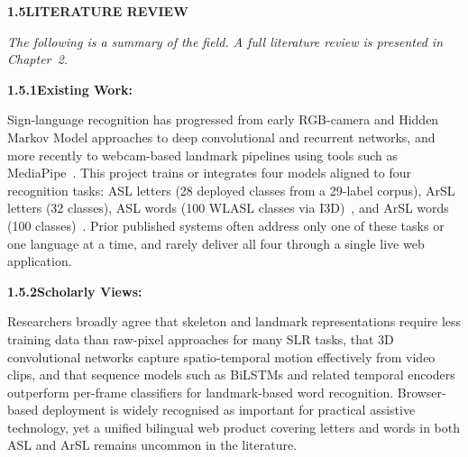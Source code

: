 \begin{secopen}
\noindent\textbf{1.5\quad LITERATURE REVIEW}\par
{}
\vspace{0.4cm}

\noindent\textit{The following is a summary of the field. A full literature review is presented in Chapter~2.}\par\vspace{0.4cm}

\noindent\textbf{1.5.1\quad Existing Work:}\par
{}
\vspace{0.3cm}

\noindent Sign-language recognition has progressed from early RGB-camera and Hidden Markov Model approaches to deep convolutional and recurrent networks, and more recently to webcam-based landmark pipelines using tools such as MediaPipe~\cite{zhang2020mediapipe,mediapipeweb,rastgoo2021survey}. This project trains or integrates four models aligned to four recognition tasks: ASL letters (28 deployed classes from a 29-label corpus), ArSL letters (32 classes), ASL words (100 WLASL classes via I3D)~\cite{li2020wlasl}, and ArSL words (100 classes)~\cite{sidig2021karsl}. Prior published systems often address only one of these tasks or one language at a time, and rarely deliver all four through a single live web application.\par
\end{secopen}
\vspace{0.4cm}

\noindent\textbf{1.5.2\quad Scholarly Views:}\par
{}
\vspace{0.3cm}

\noindent Researchers broadly agree that skeleton and landmark representations require less training data than raw-pixel approaches for many SLR tasks, that 3D convolutional networks capture spatio-temporal motion effectively from video clips, and that sequence models such as BiLSTMs and related temporal encoders outperform per-frame classifiers for landmark-based word recognition. Browser-based deployment is widely recognised as important for practical assistive technology, yet a unified bilingual web product covering letters and words in both ASL and ArSL remains uncommon in the literature.\par\vspace{0.4cm}

